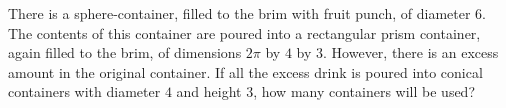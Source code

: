 There is a sphere-container, filled to the brim with fruit punch, of diameter $6$. The contents of this container are poured into a rectangular prism container, again filled to the brim, of dimensions $2\pi$ by $4$ by $3$. However, there is an excess amount in the original container. If all the excess drink is poured into conical containers with diameter $4$ and height $3$, how many containers will be used?

